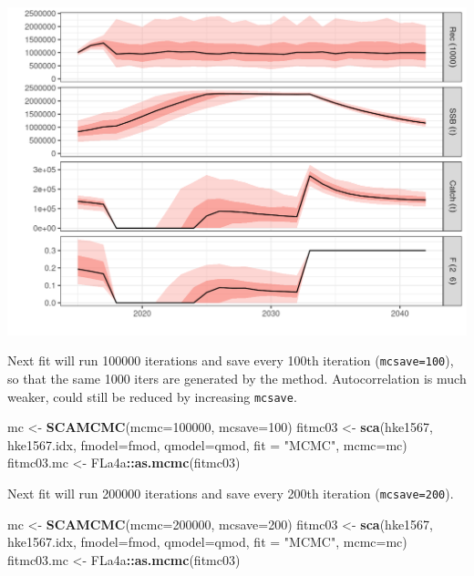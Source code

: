 \documentclass[
]{book}
\newenvironment{Shaded}{\begin{snugshade}}{\end{snugshade}}
\newcommand{\AttributeTok}[1]{\textcolor[rgb]{0.13,0.29,0.53}{#1}}
\newcommand{\DecValTok}[1]{\textcolor[rgb]{0.00,0.00,0.81}{#1}}
\newcommand{\FunctionTok}[1]{\textcolor[rgb]{0.13,0.29,0.53}{\textbf{#1}}}
\newcommand{\NormalTok}[1]{#1}
\newcommand{\OtherTok}[1]{\textcolor[rgb]{0.56,0.35,0.01}{#1}}
\newcommand{\SpecialCharTok}[1]{\textcolor[rgb]{0.81,0.36,0.00}{\textbf{#1}}}
\newcommand{\StringTok}[1]{\textcolor[rgb]{0.31,0.60,0.02}{#1}}
\begin{document}
\includegraphics{_bookdown_files/_main_files/figure-html/unnamed-chunk-124-1.png}

Next fit will run 100000 iterations and save every 100th iteration (\texttt{mcsave=100}), so that the same 1000 iters are generated by the method. Autocorrelation is much weaker, could still be reduced by increasing \texttt{mcsave}.

\begin{Shaded}
\begin{Highlighting}[]
\NormalTok{mc }\OtherTok{\textless{}{-}} \FunctionTok{SCAMCMC}\NormalTok{(}\AttributeTok{mcmc=}\DecValTok{100000}\NormalTok{, }\AttributeTok{mcsave=}\DecValTok{100}\NormalTok{)}
\NormalTok{fitmc03 }\OtherTok{\textless{}{-}} \FunctionTok{sca}\NormalTok{(hke1567, hke1567.idx, }\AttributeTok{fmodel=}\NormalTok{fmod, }\AttributeTok{qmodel=}\NormalTok{qmod, }\AttributeTok{fit =} \StringTok{"MCMC"}\NormalTok{, }\AttributeTok{mcmc=}\NormalTok{mc)}
\NormalTok{fitmc03.mc }\OtherTok{\textless{}{-}}\NormalTok{ FLa4a}\SpecialCharTok{::}\FunctionTok{as.mcmc}\NormalTok{(fitmc03)}
\end{Highlighting}
\end{Shaded}

Next fit will run 200000 iterations and save every 200th iteration (\texttt{mcsave=200}).

\begin{Shaded}
\begin{Highlighting}[]
\NormalTok{mc }\OtherTok{\textless{}{-}} \FunctionTok{SCAMCMC}\NormalTok{(}\AttributeTok{mcmc=}\DecValTok{200000}\NormalTok{, }\AttributeTok{mcsave=}\DecValTok{200}\NormalTok{)}
\NormalTok{fitmc03 }\OtherTok{\textless{}{-}} \FunctionTok{sca}\NormalTok{(hke1567, hke1567.idx, }\AttributeTok{fmodel=}\NormalTok{fmod, }\AttributeTok{qmodel=}\NormalTok{qmod, }\AttributeTok{fit =} \StringTok{"MCMC"}\NormalTok{, }\AttributeTok{mcmc=}\NormalTok{mc)}
\NormalTok{fitmc03.mc }\OtherTok{\textless{}{-}}\NormalTok{ FLa4a}\SpecialCharTok{::}\FunctionTok{as.mcmc}\NormalTok{(fitmc03)}
\end{Highlighting}
\end{Shaded}
\end{document}
